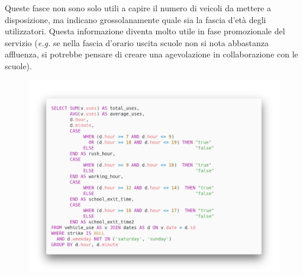 Queste fasce non sono solo utili a capire il numero di veicoli da mettere a disposizione, ma indicano grossolanamente quale sia 
la fascia d'età degli utilizzatori. Questa informazione diventa molto utile in fase promozionale del servizio (\emph{e.g.} se nella fascia d'orario
uscita scuole non si nota abbastanza affluenza, si potrebbe pensare di creare una agevolazione in collaborazione con le scuole).

\begin{figure}[H]                                                                                                                                                            
\centering                                                                                                                                                                   
\includegraphics[width=\textwidth]{images/query6}                                                                                                                                   
\label{fig:query6}                                                                                                                                                           
\end{figure}

